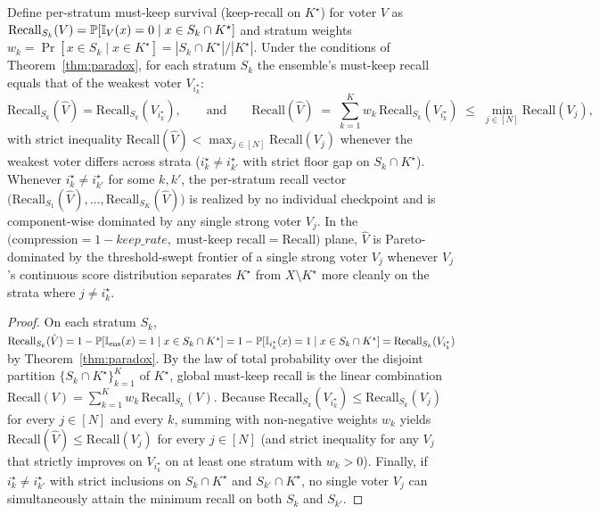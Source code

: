 \begin{corollary}
\label{cor:pareto}
Define per-stratum must-keep survival (keep-recall on $K^{\star}$) for voter $V$
as $\mathrm{Recall}_{S_k}(V) = \mathbb{P}[\mathbb{I}_V(x)=0 \mid x\in S_k\cap K^{\star}]$ and
stratum weights $w_k = \Pr[x\in S_k \mid x\in K^{\star}] = |S_k\cap K^{\star}|/|K^{\star}|$.
Under the conditions of Theorem~\ref{thm:paradox}, for each stratum $S_k$ the
ensemble's must-keep recall equals that of the weakest voter $V_{i^{\star}_k}$:
\[
  \mathrm{Recall}_{S_k}(\hat V)=\mathrm{Recall}_{S_k}(V_{i^{\star}_k}),
  \qquad\text{and}\qquad
  \mathrm{Recall}(\hat V)
  \;=\; \sum_{k=1}^{K} w_k\,\mathrm{Recall}_{S_k}(V_{i^{\star}_k})
  \;\le\; \min_{j\in[N]} \mathrm{Recall}(V_j),
\]
with strict inequality $\mathrm{Recall}(\hat V) < \max_{j\in[N]}\mathrm{Recall}(V_j)$
whenever the weakest voter differs across strata ($i^{\star}_k \neq i^{\star}_{k'}$
with strict floor gap on $S_k\cap K^{\star}$). Whenever $i^{\star}_k \neq i^{\star}_{k'}$
for some $k,k'$, the per-stratum recall vector
$\bigl(\mathrm{Recall}_{S_1}(\hat V),\dots,\mathrm{Recall}_{S_K}(\hat V)\bigr)$
is realized by no individual checkpoint and is component-wise dominated by any
single strong voter $V_j$. In the
$\bigl(\text{compression}=1-\mathit{keep\_rate},\;\text{must-keep recall}=\mathrm{Recall}\bigr)$
plane, $\hat V$ is Pareto-dominated by the threshold-swept frontier of a
single strong voter $V_j$ whenever $V_j$'s continuous score distribution separates
$K^{\star}$ from $X\setminus K^{\star}$ more cleanly on the strata where $j\neq i^{\star}_k$.
\end{corollary}

\begin{proof}
On each stratum $S_k$, $\mathrm{Recall}_{S_k}(\hat V) = 1 - \mathbb{P}[\mathbb{I}_{\mathrm{ens}}(x)=1 \mid x\in S_k\cap K^{\star}]
= 1 - \mathbb{P}[\mathbb{I}_{i^{\star}_k}(x)=1 \mid x\in S_k\cap K^{\star}] = \mathrm{Recall}_{S_k}(V_{i^{\star}_k})$
by Theorem~\ref{thm:paradox}. By the law of total probability over the disjoint
partition $\{S_k\cap K^{\star}\}_{k=1}^{K}$ of $K^{\star}$, global must-keep
recall is the linear combination $\mathrm{Recall}(V) = \sum_{k=1}^{K} w_k\,\mathrm{Recall}_{S_k}(V)$.
Because $\mathrm{Recall}_{S_k}(V_{i^{\star}_k}) \le \mathrm{Recall}_{S_k}(V_j)$
for every $j\in[N]$ and every $k$, summing with non-negative weights $w_k$
yields $\mathrm{Recall}(\hat V) \le \mathrm{Recall}(V_j)$ for every $j\in[N]$
(and strict inequality for any $V_j$ that strictly improves on $V_{i^{\star}_k}$
on at least one stratum with $w_k > 0$). Finally, if $i^{\star}_k \neq i^{\star}_{k'}$
with strict inclusions on $S_k\cap K^{\star}$ and $S_{k'}\cap K^{\star}$, no single
voter $V_j$ can simultaneously attain the minimum recall on both $S_k$ and $S_{k'}$.
\end{proof}

